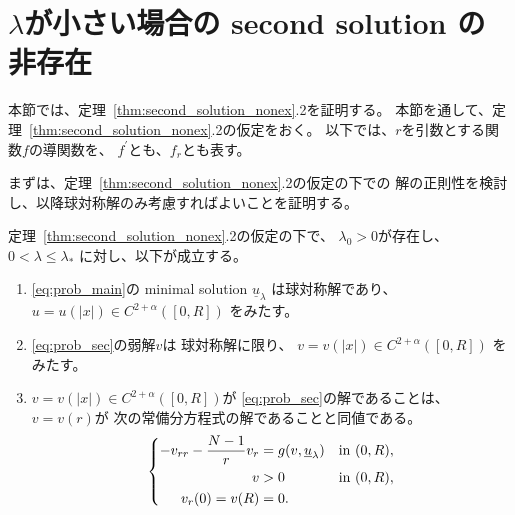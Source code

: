 \section{$\lambda$が小さい場合の second solution の非存在}
\label{sec:sym}

本節では、定理~\ref{thm:second_solution_nonex}.2を証明する。
本節を通して、定理~\ref{thm:second_solution_nonex}.2の仮定をおく。
以下では、$r$を引数とする関数$f$の導関数を、
$f^\prime$とも、$f_r$とも表す。

まずは、定理~\ref{thm:second_solution_nonex}.2の仮定の下での
解の正則性を検討し、以降球対称解のみ考慮すればよいことを証明する。

\begin{lem}
 定理~\ref{thm:second_solution_nonex}.2の仮定の下で、
 $\lambda_0 > 0$が存在し、$0 < \lambda \leq \lambda_*$
 に対し、以下が成立する。
 \begin{enumerate}[1.] \sage
  \item \ref{eq:prob_main}の minimal solution $\underline{u}_\lambda$
        は球対称解であり、
        $u = u(\lvert x \rvert)
        \in C^{2+\alpha}([0, R])$
        をみたす。
  \item \ref{eq:prob_sec}の弱解$v$は
        球対称解に限り、
        $v = v(\lvert x \rvert)
        \in C^{2+\alpha}([0, R])$
        をみたす。
  \item $v = v(\lvert x \rvert) \in C^{2+\alpha}([0, R])$が
        \ref{eq:prob_sec}の解であることは、
        $v = v(r)$が
        次の常備分方程式の解であることと同値である。
        \begin{align}
         \left\{
          \begin{aligned}
           -v_{rr} - \frac{N-1}{r}v_r  &= g(v, \underline{u}_\lambda)
           & &\text{in}~ (0, R),  \\
           v &> 0 & &\text{in}~ (0, R), \\
           v_r(0) = v(R) &= 0.  & &
          \end{aligned}
         \right. \label{eq:prob_rad}
        \end{align}
 \end{enumerate}
\end{lem}

